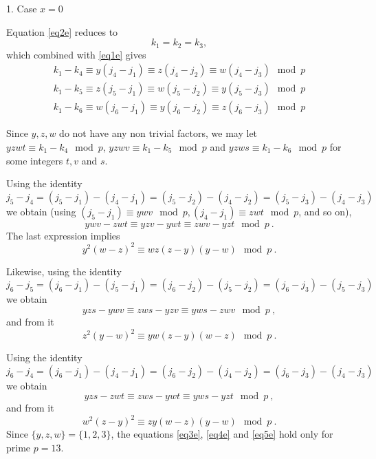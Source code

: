 1. Case $x=0$

Equation \eqref{eq2e} reduces to
\begin{equation}
k_1 = k_2 = k_3,
\end{equation}
which combined with \eqref{eq1e} gives
\begin{equation}\begin{array}{cccc}
k_1-k_4 \equiv y(j_4-j_1) \equiv z(j_4-j_2) \equiv w(j_4-j_3) \mod
p\\
k_1-k_5 \equiv z(j_5-j_1) \equiv w(j_5-j_2) \equiv y(j_5-j_3) \mod
p\\
k_1-k_6 \equiv w(j_6-j_1) \equiv y(j_6-j_2) \equiv z(j_6-j_3) \mod p
\end{array}
\end{equation}

Since $y,z,w$ do not have any non trivial factors, we may let $yzwt
\equiv k_1-k_4 \mod p$, $yzwv \equiv k_1-k_5 \mod p$ and $yzws
\equiv k_1-k_6 \mod p$ for some integers $t,v$ and $s$.

Using the identity
\begin{equation}
j_5-j_4 = (j_5-j_1)-(j_4-j_1) = (j_5-j_2)-(j_4-j_2)
=(j_5-j_3)-(j_4-j_3)
\end{equation}
we obtain (using $(j_5-j_1) \equiv ywv \mod p,(j_4-j_1) \equiv zwt
\mod p$, and so on),
\begin{equation}
ywv-zwt \equiv yzv - ywt \equiv zwv -yzt \mod p~.
\end{equation}
The last expression implies
\begin{equation}\label{eq3e}
y^2(w-z)^2 \equiv wz(z-y)(y-w) \mod p~.
\end{equation}

Likewise, using the identity
\begin{equation}
j_6-j_5 = (j_6-j_1)-(j_5-j_1) = (j_6-j_2)-(j_5-j_2)
=(j_6-j_3)-(j_5-j_3)
\end{equation}
we obtain
\begin{equation}
yzs-ywv \equiv zws-yzv \equiv yws-zwv \mod p~,
\end{equation}
and from it
\begin{equation}\label{eq4e}
z^2(y-w)^2 \equiv yw(z-y)(w-z) \mod p~.
\end{equation}

Using the identity
\begin{equation}
j_6-j_4 = (j_6-j_1)-(j_4-j_1) = (j_6-j_2)-(j_4-j_2)
=(j_6-j_3)-(j_4-j_3)
\end{equation}
we obtain
\begin{equation}
yzs-zwt \equiv zws-ywt \equiv yws-yzt \mod p~,
\end{equation}
and from it
\begin{equation}\label{eq5e}
w^2(z-y)^2 \equiv zy(w-z)(y-w) \mod p~.
\end{equation}
Since $\{y,z,w\}=\{1,2,3\}$, the equations \eqref{eq3e},
\eqref{eq4e} and \eqref{eq5e} hold only for prime $p=13$.

